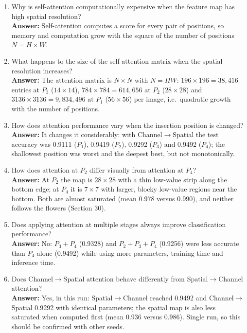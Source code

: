 \documentclass[10pt]{article}
\begin{document}
\begin{enumerate}
\item Why is self-attention computationally expensive when the feature map
has high spatial resolution?\\
\textbf{Answer:} Self-attention computes a score for every pair of positions, so memory and computation grow with the square of the number of positions $N=H\times W$.

\item What happens to the size of the self-attention matrix when the spatial
resolution increases?\\
\textbf{Answer:} The attention matrix is $N\times N$ with $N=HW$: $196\times196=38{,}416$ entries at $P_3$ ($14\times14$), $784\times784=614{,}656$ at $P_2$ ($28\times28$) and $3136\times3136=9{,}834{,}496$ at $P_1$ ($56\times56$) per image, i.e.\ quadratic growth with the number of positions.

\item How does attention performance vary when the insertion position is
changed?\\
\textbf{Answer:} It changes it considerably: with Channel$\rightarrow$Spatial the test accuracy was 0.9111 ($P_1$), 0.9419 ($P_2$), 0.9292 ($P_3$) and 0.9492 ($P_4$); the shallowest position was worst and the deepest best, but not monotonically.

\item How does attention at $P_2$ differ visually from attention at $P_4$?\\
\textbf{Answer:} At $P_2$ the map is $28\times28$ with a thin low-value strip along the bottom edge; at $P_4$ it is $7\times7$ with larger, blocky low-value regions near the bottom. Both are almost saturated (mean 0.978 versus 0.990), and neither follows the flowers (Section 30).

\item Does applying attention at multiple stages always improve
classification performance?\\
\textbf{Answer:} No: $P_3+P_4$ (0.9328) and $P_2+P_3+P_4$ (0.9256) were less accurate than $P_4$ alone (0.9492) while using more parameters, training time and inference time.

\item Does Channel$\rightarrow$Spatial attention behave differently from
Spatial$\rightarrow$Channel attention?\\
\textbf{Answer:} Yes, in this run: Spatial$\rightarrow$Channel reached 0.9492 and Channel$\rightarrow$Spatial 0.9292 with identical parameters; the spatial map is also less saturated when computed first (mean 0.936 versus 0.986). Single run, so this should be confirmed with other seeds.


\end{enumerate}
\end{document}
